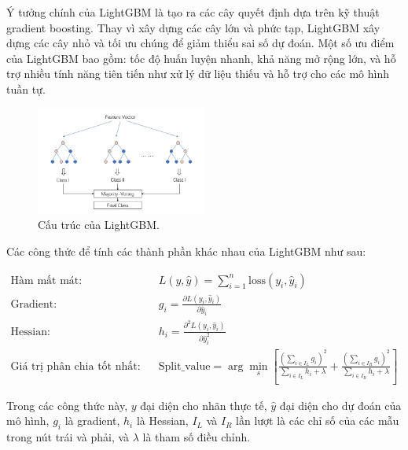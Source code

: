 \documentclass{ieeeojies}
\begin{document}
Ý tưởng chính của LightGBM là tạo ra các cây quyết định dựa trên kỹ thuật gradient boosting. Thay vì xây dựng các cây lớn và phức tạp, LightGBM xây dựng các cây nhỏ và tối ưu chúng để giảm thiểu sai số dự đoán. Một số ưu điểm của LightGBM bao gồm: tốc độ huấn luyện nhanh, khả năng mở rộng lớn, và hỗ trợ nhiều tính năng tiên tiến như xử lý dữ liệu thiếu và hỗ trợ cho các mô hình tuần tự.

\begin{figure}[h]
    \centering
    \includegraphics[width=0.5\textwidth]{bibliography/lightgbm.png}
    \caption{Cấu trúc của LightGBM.}
\end{figure}

Các công thức để tính các thành phần khác nhau của LightGBM như sau: 

\begin{align*}
\text{Hàm mất mát:} \quad & L(y, \hat{y}) = \sum_{i=1}^{n} \text{loss}(y_i, \hat{y}_i) \\
\text{Gradient:} \quad & g_i = \frac{\partial L(y_i, \hat{y}_i)}{\partial \hat{y}_i} \\
\text{Hessian:} \quad & h_i = \frac{\partial^2 L(y_i, \hat{y}_i)}{\partial \hat{y}_i^2} \\
\text{Giá trị phân chia tốt nhất:} \quad & \text{Split\_value} = \arg\min_{s} \left[ \frac{(\sum_{i \in I_L} g_i)^2}{\sum_{i \in I_L} h_i + \lambda} + \frac{(\sum_{i \in I_R} g_i)^2}{\sum_{i \in I_R} h_i + \lambda} \right]
\end{align*}

Trong các công thức này, $y$ đại diện cho nhãn thực tế, $\hat{y}$ đại diện cho dự đoán của mô hình, $g_i$ là gradient, $h_i$ là Hessian, $I_L$ và $I_R$ lần lượt là các chỉ số của các mẫu trong nút trái và phải, và $\lambda$ là tham số điều chỉnh.
\end{document}
